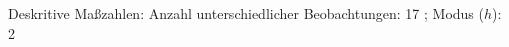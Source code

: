 				\label{tableValues:status}
				\vspace*{-\baselineskip}
                    \begin{noten}
                	    \note{} Deskritive Maßzahlen:
                	    Anzahl unterschiedlicher Beobachtungen: 17%
                	    ; 
                	      Modus ($h$): 2
                     \end{noten}


